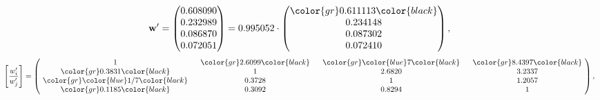 \begin{example}
\begin{equation*}
\mathbf{w}^{\prime} =
\begin{pmatrix}
0.608090\\
0.232989\\
0.086870\\
0.072051
\end{pmatrix} =
0.995052\cdot
\begin{pmatrix}
\color{gr} 0.611113\color{black} \\
0.234148\\
0.087302\\
0.072410
\end{pmatrix},
\end{equation*}
\begin{equation*}
\left[ \frac{{w}^{\prime}_i}{{w}^{\prime}_j} \right] =
\begin{pmatrix}
$\,\,$ 1 $\,\,$ & $\,\,$\color{gr} 2.6099\color{black} $\,\,$ & $\,\,$\color{gr} \color{blue} 7\color{black} $\,\,$ & $\,\,$\color{gr} 8.4397\color{black} $\,\,$ \\
$\,\,$\color{gr} 0.3831\color{black} $\,\,$ & $\,\,$ 1 $\,\,$ & $\,\,$2.6820$\,\,$ & $\,\,$3.2337  $\,\,$ \\
$\,\,$\color{gr} \color{blue}  1/7\color{black} $\,\,$ & $\,\,$0.3728$\,\,$ & $\,\,$ 1 $\,\,$ & $\,\,$1.2057 $\,\,$ \\
$\,\,$\color{gr} 0.1185\color{black} $\,\,$ & $\,\,$0.3092$\,\,$ & $\,\,$0.8294$\,\,$ & $\,\,$ 1  $\,\,$ \\
\end{pmatrix},
\end{equation*}
\end{example}
\newpage

